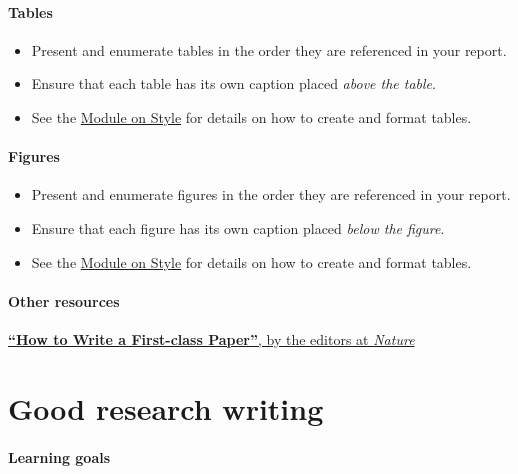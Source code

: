 \documentclass[
]{book}
\begin{document}
\hypertarget{tables}{%
\subsubsection*{Tables}\label{tables}}

\begin{itemize}
\item
  Present and enumerate tables in the order they are referenced in your report.
\item
  Ensure that each table has its own caption placed \emph{above the table}.
\item
  See the \protect\hyperlink{style}{Module on Style} for details on how to create and format tables.
\end{itemize}

\hypertarget{figures}{%
\subsubsection*{Figures}\label{figures}}

\begin{itemize}
\item
  Present and enumerate figures in the order they are referenced in your report.
\item
  Ensure that each figure has its own caption placed \emph{below the figure}.
\item
  See the \protect\hyperlink{style}{Module on Style} for details on how to create and format tables.
\end{itemize}

\hypertarget{other-resources-3}{%
\subsubsection*{Other resources}\label{other-resources-3}}

\href{https://www.nature.com/articles/d41586-018-02404-4}{\textbf{``How to Write a First-class Paper''}, by the editors at \emph{Nature}}

\hypertarget{style}{%
\chapter{Good research writing}\label{style}}

\hypertarget{learning-goals-18}{%
\subsubsection*{Learning goals}\label{learning-goals-18}}
\end{document}
